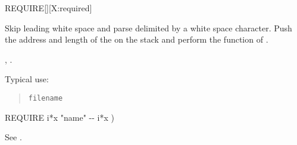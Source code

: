 \begin{worddef}{}{REQUIRE}[][X:required]
\item {}

	Skip leading white space and parse  delimited by a
	white space character. Push the address and length of the
	 on the stack and perform the function of
	.

\see {},
	.

	\begin{rationale} %
		Typical use:
		\begin{quote}
			 \texttt{filename}
		\end{quote}
	\end{rationale}

	\begin{implement} %
		\word{:} REQUIRE  i*x "name" -{}- i*x ) \\
		\tab {}  \word{;}
	\end{implement}

	\begin{testing} %
		See .
	\end{testing}
\end{worddef}


